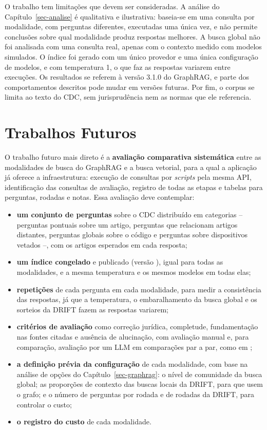 O trabalho tem limitações que devem ser consideradas. A análise do Capítulo~\ref{sec-analise} é qualitativa e ilustrativa: baseia-se em uma consulta por modalidade, com perguntas diferentes, executadas uma única vez, e não permite conclusões sobre qual modalidade produz respostas melhores. A busca global não foi analisada com uma consulta real, apenas com o contexto medido com modelos simulados. O índice foi gerado com um único provedor e uma única configuração de modelos, e com temperatura 1, o que faz as respostas variarem entre execuções. Os resultados se referem à versão 3.1.0 do GraphRAG, e parte dos comportamentos descritos pode mudar em versões futuras. Por fim, o corpus se limita ao texto do CDC, sem jurisprudência nem as normas que ele referencia.

\section{Trabalhos Futuros}
\label{sec-conclusoes-trabalhosfuturos}

O trabalho futuro mais direto é a \textbf{avaliação comparativa sistemática} entre as modalidades de busca do GraphRAG e a busca vetorial, para a qual a aplicação já oferece a infraestrutura: execução de consultas por \textit{scripts} pela mesma API, identificação das consultas de avaliação, registro de todas as etapas e tabelas para perguntas, rodadas e notas. Essa avaliação deve contemplar:

\begin{itemize}
    \item \textbf{um conjunto de perguntas} sobre o CDC distribuído em categorias -- perguntas pontuais sobre um artigo, perguntas que relacionam artigos distantes, perguntas globais sobre o código e perguntas sobre dispositivos vetados --, com os artigos esperados em cada resposta;
    \item \textbf{um índice congelado} e publicado (versão ), igual para todas as modalidades, e a mesma temperatura e os mesmos modelos em todas elas;
    \item \textbf{repetições} de cada pergunta em cada modalidade, para medir a consistência das respostas, já que a temperatura, o embaralhamento da busca global e os sorteios da DRIFT fazem as respostas variarem;
    \item \textbf{critérios de avaliação} como correção jurídica, completude, fundamentação nas fontes citadas e ausência de alucinação, com avaliação manual e, para comparação, avaliação por um LLM em comparações par a par, como em ;
    \item \textbf{a definição prévia da configuração} de cada modalidade, com base na análise de opções do Capítulo~\ref{sec-graphrag}: o nível de comunidade da busca global; as proporções de contexto das buscas locais da DRIFT, para que usem o grafo; e o número de perguntas por rodada e de rodadas da DRIFT, para controlar o custo;
    \item \textbf{o registro do custo} de cada modalidade.
\end{itemize}


